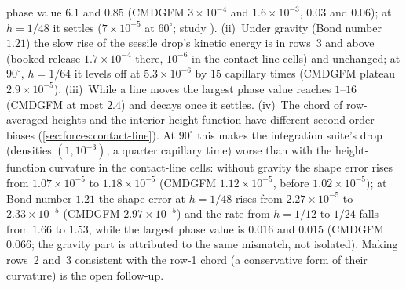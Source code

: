 phase value $6.1$ and $0.85$ (CMDGFM $3\times10^{-4}$ and $1.6\times10^{-3}$,
$0.03$ and $0.06$); at $h=1/48$ it settles ($7\times10^{-5}$ at $60^\circ$; study
). (ii)~Under
gravity (Bond number $1.21$) the slow rise of the sessile drop's kinetic
energy is in rows~3 and above (booked release $1.7\times10^{-4}$ there,
$10^{-6}$ in the contact-line cells) and unchanged; at $90^\circ$, $h=1/64$ it
levels off at $5.3\times10^{-6}$ by $15$ capillary times (CMDGFM plateau
$2.9\times10^{-5}$). (iii)~While a line moves the largest phase value reaches
$1$--$16$ (CMDGFM at most $2.4$) and decays once it settles. (iv)~The chord of
row-averaged heights and the interior height function have different
second-order biases (\cref{sec:forces:contact-line}). At $90^\circ$ this makes
the integration suite's drop (densities $(1,10^{-3})$, a quarter capillary
time) worse than with the height-function curvature in the contact-line
cells: without gravity the shape error rises from $1.07\times10^{-5}$ to
$1.18\times10^{-5}$ (CMDGFM $1.12\times10^{-5}$, before $1.02\times10^{-5}$); at
Bond number $1.21$ the shape error at $h=1/48$ rises from $2.27\times10^{-5}$
to $2.33\times10^{-5}$ (CMDGFM $2.97\times10^{-5}$) and the rate from $h=1/12$
to $1/24$ falls from $1.66$ to $1.53$, while the largest phase value is
$0.016$ and $0.015$ (CMDGFM $0.066$; the gravity part is attributed to the
same mismatch, not isolated). Making rows~2 and~3 consistent with the row-1
chord (a conservative form of their curvature) is the open follow-up.

